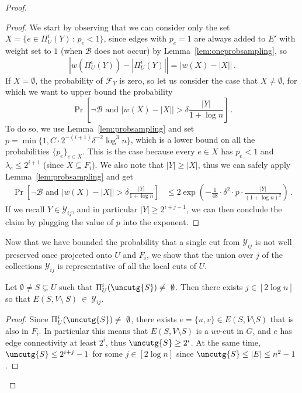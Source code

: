 \begin{proof}
\begin{proof}
	We start by observing that we can consider only the set $X = \{e \in \Pi_U^i(Y) \, : \, p_e < 1\}$, since edges with $p_e=1$ are always added to $E'$ with weight set to $1$ (when $ \mathcal{B}$ does not occur) by Lemma~\ref{lem:oneprobsampling}, so
	\begin{equation*}
		\left|w(\Pi_U^{i}(Y)) - |\Pi_U^{i}(Y)|\right| = \left|w(X) - |X|\right| \, .
	\end{equation*}
	If $X = \emptyset$, the probability of $\mathcal{F}_Y$ is zero, so let us consider the case that $X \neq \emptyset$, for which we want to upper bound the probability
	\begin{equation*}
		\Pr\left[\neg \mathcal{B} \text{ and } \left|w(X) - |X|\right| > \delta \frac{|Y|}{1+\log n}\right] \, .
	\end{equation*}
	\noindent
	To do so, we use Lemma~\ref{lem:probsampling} and set $p=\min \{1, C \cdot 2^{-(i+1)} \delta^{-2} \log^3 n\}$, which is a lower bound on all the probabilities $\{p_e\}_{e \in X}$. This is the case because every $e \in X$ has $p_e < 1$ and $\lambda_e \le 2^{i+1}$ (since $X \subseteq F_i$). We also note that $|Y| \ge |X|$, thus we can safely apply Lemma~\ref{lem:probsampling} and get
	\begin{align*}
		\Pr\left[\neg \mathcal{B} \text{ and } \left|w(X) - |X|\right| > \delta \frac{|Y|}{1+\log n}\right] & \le 2 \exp\left(-\frac{1}{48}\cdot \delta^2 \cdot p \cdot \frac{|Y|}{(1+\log n)^2} \right) \, .
	\end{align*}
	If we recall $Y \in \mathcal{Y}_{ij}$, and in particular $|Y| \ge 2^{i+j-1}$, we can then conclude the claim by plugging the value of $p$ into the exponent.
\end{proof}
\noindent
Now that we have bounded the probability that a single cut from $\mathcal{Y}_{ij}$ is not well preserved once projected onto $U$ and $F_i$, we show that the union over $j$ of the collections $\mathcal{Y}_{ij}$ is representative of all the local cuts of $U$.
\begin{claim}
	\label{claim:calyisenough}
	Let $\emptyset \neq S \subsetneq U$ such that $\Pi_U^i(\uncutg{S})\neq~\emptyset$. Then there exists $j \in [2\log n]$ so that $ E(S,V \setminus~S)~\in~\mathcal{Y}_{ij}$.
\end{claim}
\begin{proof}
	Since $\Pi_U^i(\uncutg{S}) \neq~\emptyset$, there exists $e=\{u,v\} \in E(S,V\setminus S)$ that is also in $F_i$. In particular this means that $E(S,V\setminus S)$ is a $uv$-cut in $G$, and $e$ has edge connectivity at least $2^i$, thus $\uncutg{S} \ge 2^{i}$. At the same time, $\uncutg{S} \le 2^{i+j}-1$ for some $j \in [2\log n]$ since $\uncutg{S} \le |E| \le n^2-1$.

\end{proof}
\end{proof}

